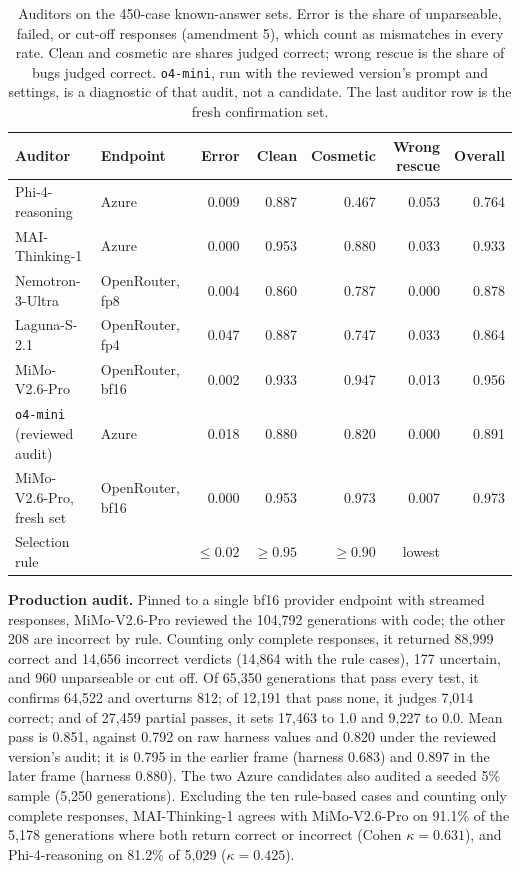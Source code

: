\documentclass{article}
\begin{document}
\begin{table}[h]
\centering
\caption{Auditors on the 450-case known-answer sets. Error is the share of unparseable, failed, or cut-off responses (amendment 5), which count as mismatches in every rate. Clean and cosmetic are shares judged correct; wrong rescue is the share of bugs judged correct. \texttt{o4-mini}, run with the reviewed version's prompt and settings, is a diagnostic of that audit, not a candidate. The last auditor row is the fresh confirmation set.}
\label{tab:auditor-pilot}
\small
\begin{tabular}{@{}llrrrrr@{}}
\toprule
Auditor & Endpoint & Error & Clean & Cosmetic & Wrong rescue & Overall \\
\midrule
Phi-4-reasoning & Azure & 0.009 & 0.887 & 0.467 & 0.053 & 0.764 \\
MAI-Thinking-1 & Azure & 0.000 & 0.953 & 0.880 & 0.033 & 0.933 \\
Nemotron-3-Ultra & OpenRouter, fp8 & 0.004 & 0.860 & 0.787 & 0.000 & 0.878 \\
Laguna-S-2.1 & OpenRouter, fp4 & 0.047 & 0.887 & 0.747 & 0.033 & 0.864 \\
MiMo-V2.6-Pro & OpenRouter, bf16 & 0.002 & 0.933 & 0.947 & 0.013 & 0.956 \\
\texttt{o4-mini} (reviewed audit) & Azure & 0.018 & 0.880 & 0.820 & 0.000 & 0.891 \\
\midrule
MiMo-V2.6-Pro, fresh set & OpenRouter, bf16 & 0.000 & 0.953 & 0.973 & 0.007 & 0.973 \\
\midrule
Selection rule & & $\leq0.02$ & $\geq0.95$ & $\geq0.90$ & lowest & \\
\bottomrule
\end{tabular}
\end{table}

\textbf{Production audit.} Pinned to a single bf16 provider endpoint with streamed responses, MiMo-V2.6-Pro reviewed the 104{,}792 generations with code; the other 208 are incorrect by rule. Counting only complete responses, it returned 88{,}999 correct and 14{,}656 incorrect verdicts (14{,}864 with the rule cases), 177 uncertain, and 960 unparseable or cut off. Of 65{,}350 generations that pass every test, it confirms 64{,}522 and overturns 812; of 12{,}191 that pass none, it judges 7{,}014 correct; and of 27{,}459 partial passes, it sets 17{,}463 to 1.0 and 9{,}227 to 0.0. Mean pass is 0.851, against 0.792 on raw harness values and 0.820 under the reviewed version's audit; it is 0.795 in the earlier frame (harness 0.683) and 0.897 in the later frame (harness 0.880). The two Azure candidates also audited a seeded 5\% sample (5{,}250 generations). Excluding the ten rule-based cases and counting only complete responses, MAI-Thinking-1 agrees with MiMo-V2.6-Pro on 91.1\% of the 5{,}178 generations where both return correct or incorrect (Cohen $\kappa=0.631$), and Phi-4-reasoning on 81.2\% of 5{,}029 ($\kappa=0.425$).
\end{document}
